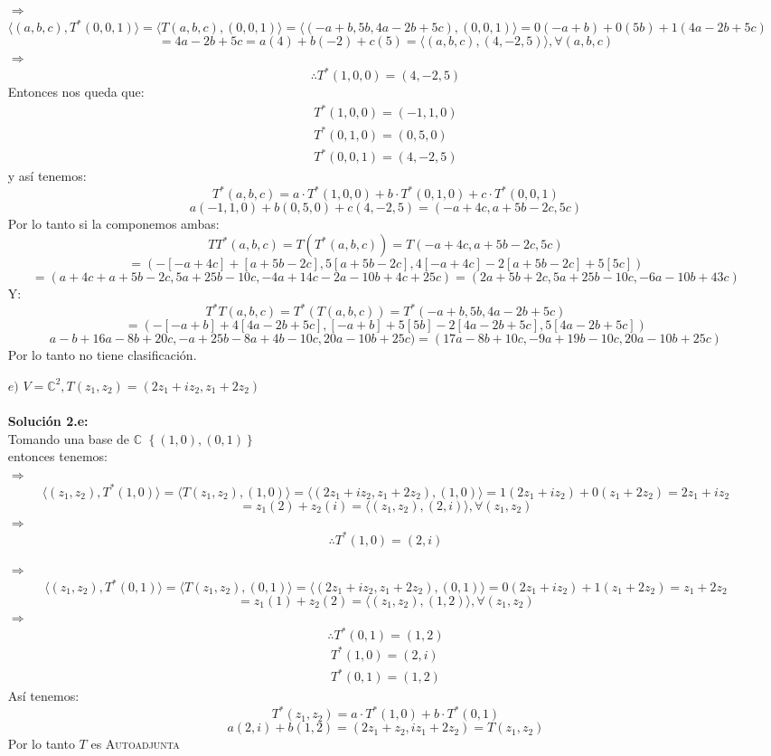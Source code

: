 \begin{itemize}
        $\Rightarrow$
        $$\langle (a,b,c),T^*(0,0,1)\rangle =\langle T(a,b,c),(0,0,1)\rangle=\langle (-a+b,5b, 4a-2b+5c),(0,0,1)\rangle=0(-a+b)+0(5b)+1(4a-2b+5c) $$
        $$=4a-2b+5c=a(4)+b(-2)+c(5)=\langle (a,b,c),(4,-2,5)\rangle , \forall (a,b,c)$$
        $\Rightarrow$
        $$\therefore T^*(1,0,0)=(4,-2,5)$$    
    Entonces nos queda que:\\
            \begin{align*}
           T^*(1,0,0)=(-1,1,0)\\
           T^*(0,1,0)=(0,5,0)\\
           T^*(0,0,1)=(4,-2,5)
        \end{align*}
        y así tenemos:
        $$T^*(a,b,c)=a\cdot T^*(1,0,0)+b \cdot T^*(0,1,0)+c \cdot T^*(0,0,1)$$
        $$a(-1,1,0)+b(0,5,0)+c(4,-2,5) =(-a+4c,a+5b-2c,5c)$$
        Por lo tanto si la componemos ambas:
        \[TT^*(a,b,c)=T(T^*(a,b,c))=T(-a+4c,a+5b-2c,5c)\]\[=(-[-a+4c]+[a+5b-2c],5[a+5b-2c],4[-a+4c]-2[a+5b-2c]+5[5c])\]\[=(a+4c+a+5b-2c,5a+25b-10c,-4a+14c-2a-10b+4c+25c)=(2a+5b+2c,5a+25b-10c,-6a-10b+43c)\]
        Y:
        \[T^*T(a,b,c)=T^*(T(a,b,c))=T^*(-a+b,5b, 4a-2b+5c)\]\[=(-[-a+b]+4[4a-2b+5c],[-a+b]+5[5b]-2[4a-2b+5c],5[4a-2b+5c])\]
        \[a-b+16a-8b+20c,-a+25b-8a+4b-10c,20a-10b+25c)=(17a-8b+10c,-9a+19b-10c,20a-10b+25c)\]
        Por lo tanto no tiene clasificaci\'on.\\
        
    \item [$e)$] $V=\mathbb{C}^2,T(z_1,z_2)=(2z_1+iz_2,z_1+2z_2)$\\\\
        \textbf{Soluci\'on 2.e:}\\
        Tomando una base de $\mathbb{C}$ $\left \{ (1,0),(0,1) \right \}$\\
         entonces tenemos:\\
        $\Rightarrow$
        $$\langle (z_1,z_2),T^*(1,0)\rangle =\langle T(z_1,z_2),(1,0)\rangle =\langle (2z_1+iz_2,z_1+2z_2),(1,0)\rangle=1(2z_1+iz_2)+0(z_1+2z_2)=2z_1+iz_2 $$
        $$=z_1(2)+z_2(i)=\langle (z_1,z_2),(2,i)\rangle , \forall (z_1,z_2)$$
        $\Rightarrow$
        $$\therefore T^*(1,0)=(2,i)$$
        
        $\Rightarrow$
        $$\langle (z_1,z_2),T^*(0,1)\rangle =\langle T(z_1,z_2),(0,1)\rangle =\langle (2z_1+iz_2,z_1+2z_2),(0,1)\rangle=0(2z_1+iz_2)+1(z_1+2z_2)=z_1+2z_2 $$
        $$=z_1(1)+z_2(2)=\langle (z_1,z_2),(1,2)\rangle , \forall (z_1,z_2)$$
        $\Rightarrow$
        $$\therefore T^*(0,1)=(1,2)$$         
        \begin{align*}
            T^*(1,0)=(2,i)\\
            T^*(0,1)=(1,2)
        \end{align*}
        Así tenemos:
        $$T^*(z_1,z_2)=a\cdot T^*(1,0)+b\cdot T^*(0,1)$$
        $$a(2,i)+b(1,2)=(2z_1+z_2,iz_1+2z_2)=T(z_1,z_2)$$
        Por lo tanto $T$ es \textsc{Autoadjunta}
    
\end{itemize}





